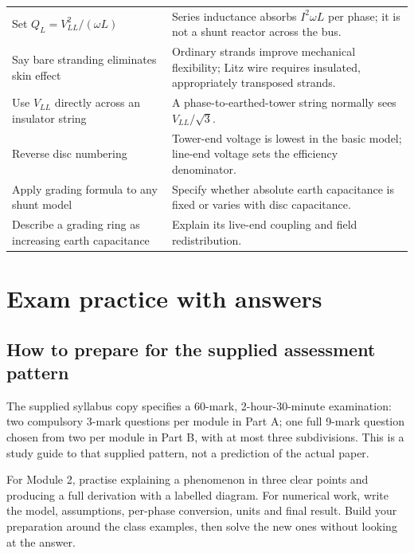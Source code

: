 \documentclass[11pt,a4paper]{article}
\newcommand{\chapterstart}[2]{\clearpage\section{#1}\label{#2}}
\begin{document}
\begin{longtable}{L{.43\textwidth}L{.50\textwidth}}
Set $Q_L=V_{LL}^2/(\omega L)$ & Series inductance absorbs $I^2\omega L$ per phase; it is not a shunt reactor across the bus.\\
Say bare stranding eliminates skin effect & Ordinary strands improve mechanical flexibility; Litz wire requires insulated, appropriately transposed strands.\\
Use $V_{LL}$ directly across an insulator string & A phase-to-earthed-tower string normally sees $V_{LL}/\sqrt3$.\\
Reverse disc numbering & Tower-end voltage is lowest in the basic model; line-end voltage sets the efficiency denominator.\\
Apply grading formula to any shunt model & Specify whether absolute earth capacitance is fixed or varies with disc capacitance.\\
Describe a grading ring as increasing earth capacitance & Explain its live-end coupling and field redistribution.\\\bottomrule
\end{longtable}

\chapterstart{Exam practice with answers}{practice}
\subsection{How to prepare for the supplied assessment pattern}
The supplied syllabus copy specifies a 60-mark, 2-hour-30-minute examination: two compulsory 3-mark questions per module in Part A; one full 9-mark question chosen from two per module in Part B, with at most three subdivisions. This is a study guide to that supplied pattern, not a prediction of the actual paper.

For Module 2, practise explaining a phenomenon in three clear points and producing a full derivation with a labelled diagram. For numerical work, write the model, assumptions, per-phase conversion, units and final result. Build your preparation around the class examples, then solve the new ones without looking at the answer.
\end{document}
